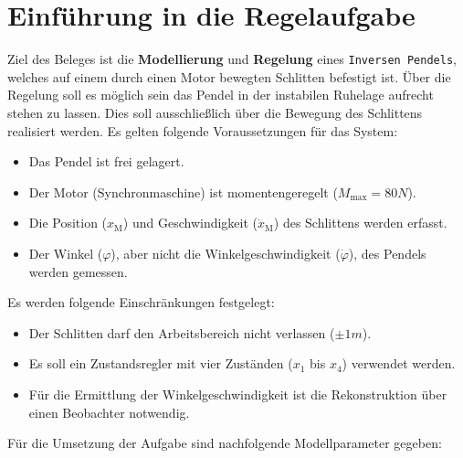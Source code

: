 \section{Einführung in die Regelaufgabe} \label{einfuehrung}

Ziel des Beleges ist die \textbf{Modellierung} und \textbf{Regelung} eines \texttt{Inversen Pendels}, welches auf einem durch einen Motor bewegten Schlitten befestigt ist. Über die Regelung soll es möglich sein das Pendel in der instabilen Ruhelage aufrecht stehen zu lassen. Dies soll ausschließlich über die Bewegung des Schlittens realisiert werden. Es gelten folgende Voraussetzungen für das System:

\begin{itemize}
    \item Das Pendel ist frei gelagert.
    \item Der Motor (Synchronmaschine) ist momentengeregelt ($M_{\mathrm{max}} = 80N$).
    \item Die Position ($x_{\mathrm{M}}$) und Geschwindigkeit ($\dot{x}_{\mathrm{M}}$) des Schlittens werden erfasst.
    \item Der Winkel ($\varphi$), aber nicht die Winkelgeschwindigkeit ($\dot{\varphi}$), des Pendels werden gemessen.
\end{itemize}

Es werden folgende Einschränkungen festgelegt:

\begin{itemize}
    \item Der Schlitten darf den Arbeitsbereich nicht verlassen ($\pm 1m$).
    \item Es soll ein Zustandsregler mit vier Zuständen ($x_{\mathrm{1}}$ bis $x_{\mathrm{4}}$) verwendet werden.
    \item Für die Ermittlung der Winkelgeschwindigkeit ist die Rekonstruktion über einen Beobachter notwendig.
\end{itemize}

Für die Umsetzung der Aufgabe sind nachfolgende Modellparameter gegeben:

